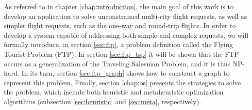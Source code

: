As referred to in chapter \ref{chap:introduction}, the main goal of this work is to develop an application to solve unconstrained multi-city flight requests, as well as simpler flight requests, such as the one-way and round-trip flights. In order to develop a system capable of addressing both simple and complex requests, we will formally introduce, in section \ref{sec:ftp}, a problem definition called the Flying Tourist Problem (FTP). In section \ref{sec:ftp_tsp} it will be shown that the FTP occurs as a generalization of the Traveling Salesman Problem, and it is thus NP-hard. In its turn, section \ref{sec:ftp_graph} shows how to construct a graph to represent this problem. Finally, section \ref{chap:os} presents the  strategies to solve the problem, which include both heuristic and metaheuristic optimization algorithms (subsection \ref{sec:heuristic} and \ref{sec:meta}, respectively).
